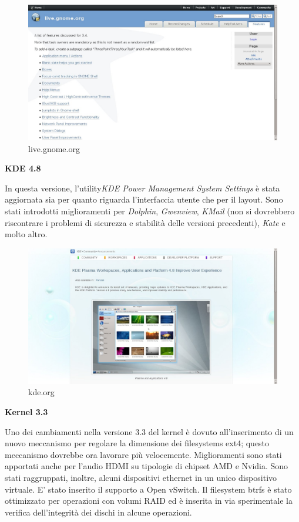 \begin{figure}[!h]
\centering
\includegraphics[scale=.20]{articoli/notizie/immagini/gnome_3_4.jpeg}
\caption{live.gnome.org}
\end{figure}
\begin{center}
{\centering\bfseries KDE 4.8}
\end{center}
In questa versione, l'utility{\itshape KDE Power Management System Settings} è stata aggiornata sia per quanto riguarda l'interfaccia utente che per il layout. Sono stati introdotti miglioramenti per {\itshape Dolphin}, {\itshape Gwenview}, {\itshape KMail} (non si dovrebbero riscontrare i problemi di sicurezza e stabilità delle versioni precedenti), {\itshape Kate} e molto altro.

\begin{figure}[htbp]
\centering
\includegraphics[scale=.20]{articoli/notizie/immagini/kde_4_8.jpeg}
\caption{kde.org}
\end{figure}

\begin{center}
{\centering\bfseries Kernel 3.3}
\end{center}
Uno dei cambiamenti nella versione 3.3 del kernel è dovuto all'inserimento di un nuovo meccanismo per regolare la dimensione dei filesystems ext4; questo meccanismo dovrebbe ora lavorare più velocemente. Miglioramenti sono stati apportati anche per l'audio HDMI su tipologie di chipset AMD e Nvidia. Sono stati raggruppati, inoltre, alcuni dispositivi ethernet in un unico dispositivo virtuale. E' stato inserito il supporto a Open vSwitch. Il filesystem btrfs è stato ottimizzato per operazioni con volumi RAID ed è inserita in via sperimentale la verifica dell'integrità dei dischi in alcune operazioni.

